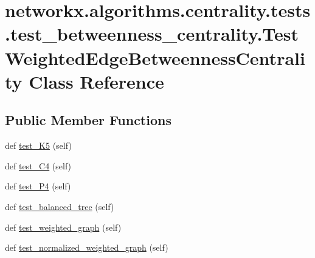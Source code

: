 \hypertarget{classnetworkx_1_1algorithms_1_1centrality_1_1tests_1_1test__betweenness__centrality_1_1TestWeightedEdgeBetweennessCentrality}{}\section{networkx.\+algorithms.\+centrality.\+tests.\+test\+\_\+betweenness\+\_\+centrality.\+Test\+Weighted\+Edge\+Betweenness\+Centrality Class Reference}
\label{classnetworkx_1_1algorithms_1_1centrality_1_1tests_1_1test__betweenness__centrality_1_1TestWeightedEdgeBetweennessCentrality}
\subsection*{Public Member Functions}
\begin{DoxyCompactItemize}
\item 
def \hyperlink{classnetworkx_1_1algorithms_1_1centrality_1_1tests_1_1test__betweenness__centrality_1_1TestWeightedEdgeBetweennessCentrality_ad8ab2805fb1869347385b58a9b4afdd3}{test\+\_\+\+K5} (self)
\item 
def \hyperlink{classnetworkx_1_1algorithms_1_1centrality_1_1tests_1_1test__betweenness__centrality_1_1TestWeightedEdgeBetweennessCentrality_a9745e7105c27b5f133fe52a1d2c25e81}{test\+\_\+\+C4} (self)
\item 
def \hyperlink{classnetworkx_1_1algorithms_1_1centrality_1_1tests_1_1test__betweenness__centrality_1_1TestWeightedEdgeBetweennessCentrality_ad2261b1047bceeff5aa62d3729955adf}{test\+\_\+\+P4} (self)
\item 
def \hyperlink{classnetworkx_1_1algorithms_1_1centrality_1_1tests_1_1test__betweenness__centrality_1_1TestWeightedEdgeBetweennessCentrality_a3240dcdb61f6020f15b4c88a56f70117}{test\+\_\+balanced\+\_\+tree} (self)
\item 
def \hyperlink{classnetworkx_1_1algorithms_1_1centrality_1_1tests_1_1test__betweenness__centrality_1_1TestWeightedEdgeBetweennessCentrality_a837d8b66e76089145d9e71110d0d9ab1}{test\+\_\+weighted\+\_\+graph} (self)
\item 
def \hyperlink{classnetworkx_1_1algorithms_1_1centrality_1_1tests_1_1test__betweenness__centrality_1_1TestWeightedEdgeBetweennessCentrality_a93a18da4c8cb62068b289b9d81b2844e}{test\+\_\+normalized\+\_\+weighted\+\_\+graph} (self)
\end{DoxyCompactItemize}


